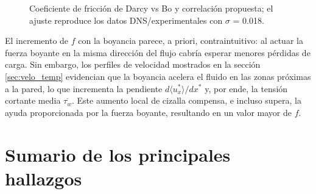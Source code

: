 \begin{figure}[H]
  \centering
  \caption{Coeficiente de fricción de Darcy vs Bo y correlación propuesta; el ajuste reproduce los datos DNS/experimentales con $\sigma$ = 0.018.}
  \label{fig:nusselt}
\end{figure}

El incremento de $f$ con la boyancia parece, a priori, contraintuitivo: al actuar la fuerza boyante en la misma dirección del flujo cabría esperar menores pérdidas de carga. Sin embargo, los perfiles de velocidad mostrados en la sección \ref{sec:velo_temp} evidencian que la boyancia acelera el fluido en las zonas próximas a la pared, lo que incrementa la pendiente $d \langle u^*_x \rangle / dx^*$ y, por ende, la tensión cortante media $\overline{\tau_w}$. Este aumento local de cizalla compensa, e incluso supera, la ayuda proporcionada por la fuerza boyante, resultando en un valor mayor de $f$.


\section{Sumario de los principales hallazgos}

